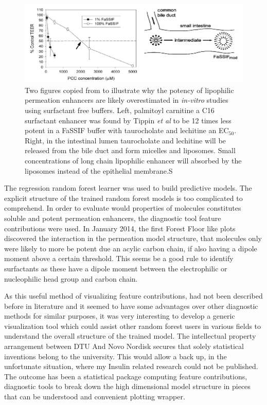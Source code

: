 \begin{figure}[!htpb]
\includegraphics[width=\textwidth,height=\textheight,keepaspectratio]{graphics/develop_fassif.pdf}
\caption{Two figures copied from \cite{tippin2008biorelevant,nawroth2011liposome} to illustrate why the potency of lipophilic permeation enhancers are likely overestimated in \textit{in-vitro} studies using surfactant free buffers. Left, palmitoyl carnitine a C16 surfactant enhancer was found by Tippin \textit{et al} to be 12 times less potent in a FaSSIF buffer with taurocholate and lechitine an EC$_{50}$. Right, in the intestinal lumen taurocholate and lechitine will be released from the bile duct and form micelles and liposomes. Small concentrations of long chain lipophilic enhancer will absorbed by the liposomes instead of the epithelial membrane.S}
\label{devel_fassif}
\end{figure}

The regression random forest learner was used to build predictive models. The explicit structure of the trained random forest models is too complicated to comprehend. In order to evaluate would properties of molecules constitutes soluble and potent permeation enhancers, the diagnostic tool feature contributions were used. In January 2014, the first Forest Floor like plots discovered the interaction in the permeation model structure, that molecules only were likely to more be potent due an acylic carbon chain, if also having a dipole moment above a certain threshold. This seems be a good rule to identify surfactants as these have a dipole moment between the electrophilic or nucleophilic head group and carbon chain.

As this useful method of visualizing feature contributions, had not been described before in literature and it seemed to have some advantages over other diagnostic methods for similar purposes, it was very interesting to develop a generic visualization tool which could assist other random forest users in various fields to understand the overall structure of the trained model. The intellectual property arrangement between DTU And Novo Nordisk secures that solely statistical inventions belong to the university. This would allow a back up, in the unfortunate situation, where my Insulin related research could not be published. The outcome has been a statistical package computing feature contributions, diagnostic tools to break down the high dimensional model structure in pieces that can be understood and convenient plotting wrapper.
